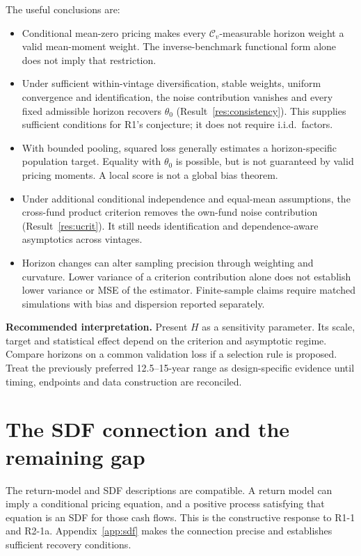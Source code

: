 \documentclass[11pt]{article}
\theoremstyle{plain}
\theoremstyle{definition}
\begin{document}
The useful conclusions are:
\begin{itemize}
\item Conditional mean-zero pricing makes every $\mathcal C_v$-measurable horizon weight a valid mean-moment weight. The inverse-benchmark functional form alone does not imply that restriction.
\item Under sufficient within-vintage diversification, stable weights, uniform convergence and identification, the noise contribution vanishes and every fixed admissible horizon recovers $\theta_0$ (Result~\ref{res:consistency}). This supplies sufficient conditions for R1's conjecture; it does not require i.i.d.\ factors.
\item With bounded pooling, squared loss generally estimates a horizon-specific population target. Equality with $\theta_0$ is possible, but is not guaranteed by valid pricing moments. A local score is not a global bias theorem.
\item Under additional conditional independence and equal-mean assumptions, the cross-fund product criterion removes the own-fund noise contribution (Result~\ref{res:ucrit}). It still needs identification and dependence-aware asymptotics across vintages.
\item Horizon changes can alter sampling precision through weighting and curvature. Lower variance of a criterion contribution alone does not establish lower variance or MSE of the estimator. Finite-sample claims require matched simulations with bias and dispersion reported separately.
\end{itemize}

\textbf{Recommended interpretation.} Present $H$ as a sensitivity parameter. Its scale, target and statistical effect depend on the criterion and asymptotic regime. Compare horizons on a common validation loss if a selection rule is proposed. Treat the previously preferred 12.5--15-year range as design-specific evidence until timing, endpoints and data construction are reconciled.

\section{The SDF connection and the remaining gap}
\label{sec:sdf}

The return-model and SDF descriptions are compatible. A return model can imply a conditional pricing equation, and a positive process satisfying that equation is an SDF for those cash flows. This is the constructive response to R1-1 and R2-1a. Appendix~\ref{app:sdf} makes the connection precise and establishes sufficient recovery conditions.
\end{document}
